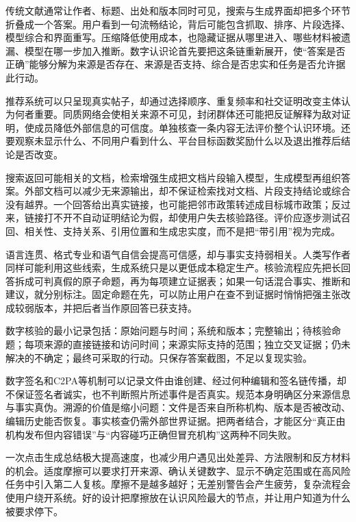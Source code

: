 传统文献通常让作者、标题、出处和版本同时可见，搜索与生成界面却把多个环节折叠成一个答案。用户看到一句流畅结论，背后可能包含抓取、排序、片段选择、模型综合和界面重写。压缩降低使用成本，也隐藏证据从哪里进入、哪些材料被遗漏、模型在哪一步加入推断。数字认识论首先要把这条链重新展开，使“答案是否正确”能够分解为来源是否存在、来源是否支持、综合是否忠实和任务是否允许据此行动。

推荐系统可以只呈现真实帖子，却通过选择顺序、重复频率和社交证明改变主体认为何者重要。同质网络会使相关来源不可见，封闭群体还可能把反证解释为敌对证明，使成员降低外部信息的可信度\parencite{oconnor2019}。单独核查一条内容无法评价整个认识环境。还要观察未显示什么、不同用户看到什么、平台目标函数奖励什么以及退出推荐后结论是否改变。

搜索返回可能相关的文档，检索增强生成把文档片段输入模型，生成模型再组织答案。外部文档可以减少无来源输出，却不保证检索找对文档、片段支持结论或综合没有越界。一个回答给出真实链接，也可能把邻市政策转述成目标城市政策；反过来，链接打不开不自动证明结论为假，却使用户失去核验路径。评价应逐步测试召回、相关性、支持关系、引用位置和生成忠实度，而不是把“带引用”视为完成。

语言连贯、格式专业和语气自信会提高可信感，却与事实支持弱相关。人类写作者同样可能利用这些线索，生成系统只是以更低成本稳定生产。核验流程应先把长回答拆成可判真假的原子命题，再为每项建立证据表；如果一句话混合事实、推断和建议，就分别标注。固定命题在先，可以防止用户在查不到证据时悄悄把强主张改成较弱版本，并把后者当作原回答已获支持。

\begin{argumentbox}
数字核验的最小记录包括：原始问题与时间；系统和版本；完整输出；待核验命题；每项来源的直接链接和访问时间；来源实际支持的范围；独立交叉证据；仍未解决的不确定；最终可采取的行动。只保存答案截图，不足以复现实验。
\end{argumentbox}

数字签名和C2PA等机制可以记录文件由谁创建、经过何种编辑和签名链传播，却不保证签名者诚实，也不判断照片所述事件是否真实。规范本身明确区分来源信息与事实真伪\parencite{c2pa2025}。溯源的价值是缩小问题：文件是否来自所称机构、版本是否被改动、编辑历史能否恢复。事实核查仍需外部世界证据。把两者结合，才能区分“真正由机构发布但内容错误”与“内容碰巧正确但冒充机构”这两种不同失败。

一次点击生成总结极大提高速度，也减少用户遇见出处差异、方法限制和反方材料的机会。适度摩擦可以要求打开来源、确认关键数字、显示不确定范围或在高风险任务中引入第二人复核。摩擦不是越多越好；无差别警告会产生疲劳，复杂流程会使用户绕开系统。好的设计把摩擦放在认识风险最大的节点，并让用户知道为什么被要求停下。

